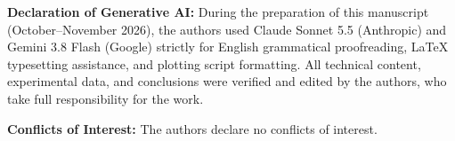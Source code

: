 \documentclass[lettersize,journal]{IEEEtran}
\begin{document}
	\noindent\textbf{Declaration of Generative AI:} During the preparation of this manuscript (October--November 2026), the authors
	used Claude Sonnet 5.5 (Anthropic) and Gemini 3.8 Flash (Google) strictly for
	English grammatical proofreading, \LaTeX{} typesetting assistance, and plotting
	script formatting. All technical content, experimental data, and conclusions
	were verified and edited by the authors, who take full responsibility for the
	work.
	
	\noindent\textbf{Conflicts of Interest:} 
	The authors declare no conflicts of interest.
	
	\balance
	
	
	
\end{document}
